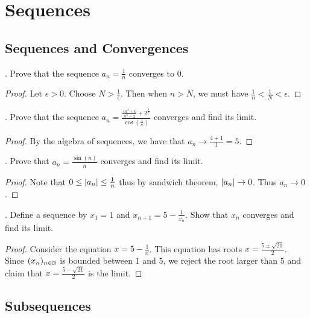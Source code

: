 \documentclass[a4paper]{article}
\begin{document}
\pagebreak
\section{Sequences}
\subsection{Sequences and Convergences}
\begin{qtn}{}{}
\thetcbcounter.\;\; Prove that the sequence $a_n=\frac{1}{n}$ converges to $0$. \tcbline
\begin{proof}
Let $\epsilon>0$. Choose $N>\frac{1}{\epsilon}$. Then when $n>N$, we must have $\frac{1}{n}<\frac{1}{N}<\epsilon$. 
\end{proof}
\end{qtn}

\begin{qtn}{}{}
\thetcbcounter.\;\; Prove that the sequence $a_n=\frac{\frac{4n^3+6}{n^3-2}+2^{\frac{1}{n}}}{\cos(\frac{1}{n})}$ converges and find its limit. \tcbline
\begin{proof}
By the algebra of sequences, we have that $a_n\to \frac{4+1}{1}=5$. 
\end{proof}
\end{qtn}

\begin{qtn}{}{}
\thetcbcounter.\;\; Prove that $a_n=\frac{\sin(n)}{n}$ converges and find its limit. \tcbline
\begin{proof}
Note that $0\leq\abs{a_n}\leq\frac{1}{n}$ thus by sandwich theorem, $\abs{a_n}\to 0$. Thus $a_n\to 0$. 
\end{proof}
\end{qtn}

\begin{qtn}{}{}
\thetcbcounter.\;\; Define a sequence by $x_1=1$ and $x_{n+1}=5-\frac{1}{x_n}$. Show that $x_n$ converges and find its limit. \tcbline
\begin{proof}
Consider the equation $x=5-\frac{1}{x}$. This equation has roots $x=\frac{5\pm\sqrt{21}}{2}$. Since $(x_n)_{n\in\mathbb{N}}$ is bounded between $1$ and $5$, we reject the root larger than $5$ and claim that $x=\frac{5-\sqrt{21}}{2}$ is the limit. 
\end{proof}
\end{qtn}

\subsection{Subsequences}
\end{document}
